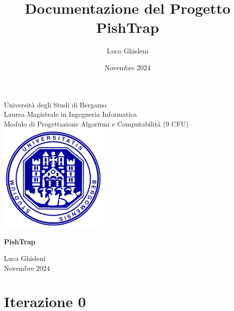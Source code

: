 \documentclass[12pt]{article}
\title{\textbf{Documentazione del Progetto PishTrap}}
\author{Luca Ghisleni}
\date{Novembre 2024}
\begin{document}
\begin{titlepage}
    \centering
    \vspace*{1cm}
    
    {\Large Università degli Studi di Bergamo \\[0.5cm]
    Laurea Magistrale in Ingegneria Informatica \\[0.5cm]
    Modulo di Progettazione Algoritmi e Computabilità (9 CFU)} \\[2cm]
    
    \includegraphics[width=0.4\textwidth]{immagini/logo.png} %
    \vspace{2cm}
    
    {\Huge \textbf{PishTrap}}
    
    \vspace{1.5cm}
    {\Large Luca Ghisleni} \\[0.5cm]
    {\large Novembre 2024}
    
    \vfill
\end{titlepage}

\tableofcontents
\newpage
\listoffigures
\listoftables
\newpage

\section{Iterazione 0}
\end{document}
